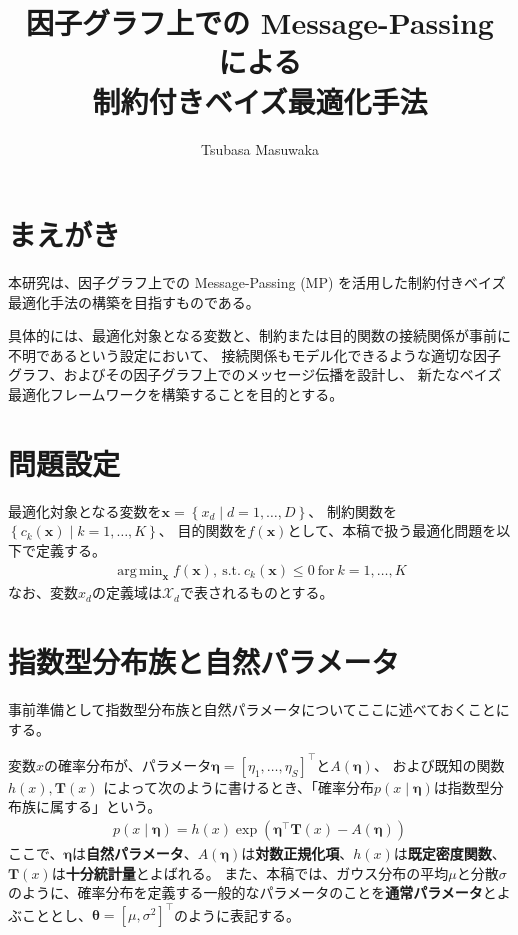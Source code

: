\documentclass[oneside,onecolumn]{jlreq}
\title{因子グラフ上での Message-Passing による\\制約付きベイズ最適化手法}
\author{Tsubasa Masuwaka}
\date{}
\DeclareMathOperator*{\argmin}{arg\,min}
\theoremstyle{plain}
\begin{document}
\maketitle

\section{まえがき}

本研究は、因子グラフ上での Message-Passing (MP) を活用した制約付きベイズ最適化手法の構築を目指すものである。

具体的には、最適化対象となる変数と、制約または目的関数の接続関係が事前に不明であるという設定において、
接続関係もモデル化できるような適切な因子グラフ、およびその因子グラフ上でのメッセージ伝播を設計し、
新たなベイズ最適化フレームワークを構築することを目的とする。

\section{問題設定}
最適化対象となる変数を$\bm{x}=\left\{x_d\mid d=1,\ldots,D\right\}$、
制約関数を$\left\{c_k\left(\bm{x}\right)\mid k=1,\ldots,K\right\}$、
目的関数を$f(\bm{x})$として、本稿で扱う最適化問題を以下で定義する。
\begin{align}
    \argmin_{\bm{x}} f\left(\bm{x}\right),~\textrm{s.t.}~c_k\left(\bm{x}\right)\leq 0~\text{for}~k=1,\ldots,K
\end{align}
なお、変数$x_d$の定義域は$\mathcal{X}_d$で表されるものとする。

\section{指数型分布族と自然パラメータ}
事前準備として指数型分布族と自然パラメータについてここに述べておくことにする。

変数$x$の確率分布が、パラメータ$\bm{\eta}=\left[\eta_1,\ldots,\eta_S\right]^\top$と$A\left(\bm{\eta}\right)$、
および既知の関数$h\left(x\right), \bm{T}\left(x\right)$
によって次のように書けるとき、「確率分布$p\left(x\mid\bm{\eta}\right)$は指数型分布族に属する」という。
\begin{align}
    p\left(x\mid \bm{\eta}\right) = h\left(x\right)\exp\left(\bm{\eta}^\top\bm{T}\left(x\right) - A\left(\bm{\eta}\right)\right)
\end{align}
ここで、$\bm{\eta}$は\textbf{自然パラメータ}、$A\left(\bm{\eta}\right)$は\textbf{対数正規化項}、$h\left(x\right)$は\textbf{既定密度関数}、$\bm{T}\left(x\right)$は\textbf{十分統計量}とよばれる。
また、本稿では、ガウス分布の平均$\mu$と分散$\sigma$のように、確率分布を定義する一般的なパラメータのことを\textbf{通常パラメータ}とよぶこととし、$\bm{\theta} = \left[\mu, \sigma^2\right]^\top$のように表記する。
\end{document}
